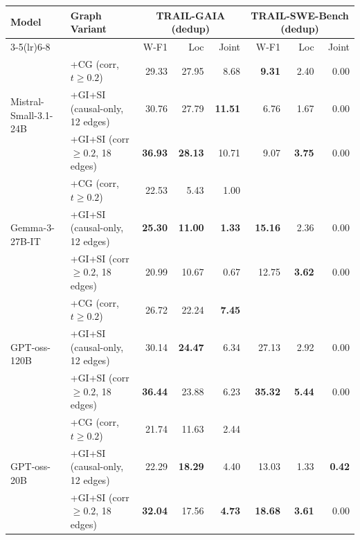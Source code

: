 \begin{table}[t]
\centering
\small
\setlength{\tabcolsep}{4pt}
\renewcommand{\arraystretch}{1.2}
\begin{tabular}{l l rrr @{\hspace{8pt}} rrr}
\toprule
\multirow{2}{*}{\textbf{Model}} &
\multirow{2}{*}{\textbf{Graph Variant}} &
\multicolumn{3}{c}{\textbf{TRAIL-GAIA (dedup)}} &
\multicolumn{3}{c}{\textbf{TRAIL-SWE-Bench (dedup)}} \\
\cmidrule(lr){3-5}\cmidrule(lr){6-8}
& & W-F1 & Loc & Joint & W-F1 & Loc & Joint \\
\midrule
\multirow{3}{*}{Mistral-Small-3.1-24B}
  & +CG (corr, $t{\geq}0.2$)              & 29.33      & 27.95      & 8.68       & \textbf{9.31} &  2.40 & 0.00 \\
  & +GI+SI (causal-only, 12 edges)        & 30.76      & 27.79      & \textbf{11.51} &  6.76 &  1.67 & 0.00 \\
  & +GI+SI (corr ${\geq}0.2$, 18 edges)   & \textbf{36.93} & \textbf{28.13} & 10.71 &  9.07 & \textbf{3.75} & 0.00 \\[3pt]
\multirow{3}{*}{Gemma-3-27B-IT}
  & +CG (corr, $t{\geq}0.2$)              & 22.53      &  5.43      & 1.00       & \text{---} & \text{---} & \text{---} \\
  & +GI+SI (causal-only, 12 edges)        & \textbf{25.30} & \textbf{11.00} & \textbf{1.33} & \textbf{15.16} &  2.36 & 0.00 \\
  & +GI+SI (corr ${\geq}0.2$, 18 edges)   & 20.99      & 10.67      & 0.67       & 12.75      & \textbf{3.62} & 0.00 \\[3pt]
\multirow{3}{*}{GPT-oss-120B}
  & +CG (corr, $t{\geq}0.2$)              & 26.72      & 22.24      & \textbf{7.45} & \text{---} & \text{---} & \text{---} \\
  & +GI+SI (causal-only, 12 edges)        & 30.14      & \textbf{24.47} & 6.34   & 27.13      &  2.92 & 0.00 \\
  & +GI+SI (corr ${\geq}0.2$, 18 edges)   & \textbf{36.44} & 23.88  & 6.23       & \textbf{35.32} & \textbf{5.44} & 0.00 \\[3pt]
\multirow{3}{*}{GPT-oss-20B}
  & +CG (corr, $t{\geq}0.2$)              & 21.74      & 11.63      & 2.44       & \text{---} & \text{---} & \text{---} \\
  & +GI+SI (causal-only, 12 edges)        & 22.29      & \textbf{18.29} & 4.40   & 13.03      &  1.33 & \textbf{0.42} \\
  & +GI+SI (corr ${\geq}0.2$, 18 edges)   & \textbf{32.04} & 17.56  & \textbf{4.73} & \textbf{18.68} & \textbf{3.61} & 0.00 \\[3pt]

\end{tabular}
\end{table}
